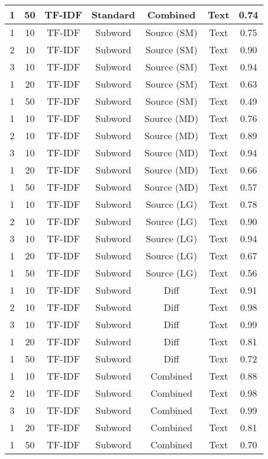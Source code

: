 \begin{longtable}{|c|c|c|c|c|c|c|}
\hline
1 & 50 & TF-IDF & Standard & Combined & Text & 0.74 \\
\hline
1 & 10 & TF-IDF & Subword & Source (SM) & Text & 0.75 \\
\hline
2 & 10 & TF-IDF & Subword & Source (SM) & Text & 0.90 \\
\hline
3 & 10 & TF-IDF & Subword & Source (SM) & Text & 0.94 \\
\hline
1 & 20 & TF-IDF & Subword & Source (SM) & Text & 0.63 \\
\hline
1 & 50 & TF-IDF & Subword & Source (SM) & Text & 0.49 \\
\hline
1 & 10 & TF-IDF & Subword & Source (MD) & Text & 0.76 \\
\hline
2 & 10 & TF-IDF & Subword & Source (MD) & Text & 0.89 \\
\hline
3 & 10 & TF-IDF & Subword & Source (MD) & Text & 0.94 \\
\hline
1 & 20 & TF-IDF & Subword & Source (MD) & Text & 0.66 \\
\hline
1 & 50 & TF-IDF & Subword & Source (MD) & Text & 0.57 \\
\hline
1 & 10 & TF-IDF & Subword & Source (LG) & Text & 0.78 \\
\hline
2 & 10 & TF-IDF & Subword & Source (LG) & Text & 0.90 \\
\hline
3 & 10 & TF-IDF & Subword & Source (LG) & Text & 0.94 \\
\hline
1 & 20 & TF-IDF & Subword & Source (LG) & Text & 0.67 \\
\hline
1 & 50 & TF-IDF & Subword & Source (LG) & Text & 0.56 \\
\hline
1 & 10 & TF-IDF & Subword & Diff & Text & 0.91 \\
\hline
2 & 10 & TF-IDF & Subword & Diff & Text & 0.98 \\
\hline
3 & 10 & TF-IDF & Subword & Diff & Text & 0.99 \\
\hline
1 & 20 & TF-IDF & Subword & Diff & Text & 0.81 \\
\hline
1 & 50 & TF-IDF & Subword & Diff & Text & 0.72 \\
\hline
1 & 10 & TF-IDF & Subword & Combined & Text & 0.88 \\
\hline
2 & 10 & TF-IDF & Subword & Combined & Text & 0.98 \\
\hline
3 & 10 & TF-IDF & Subword & Combined & Text & 0.99 \\
\hline
1 & 20 & TF-IDF & Subword & Combined & Text & 0.81 \\
\hline
1 & 50 & TF-IDF & Subword & Combined & Text & 0.70 \\

\end{longtable}
